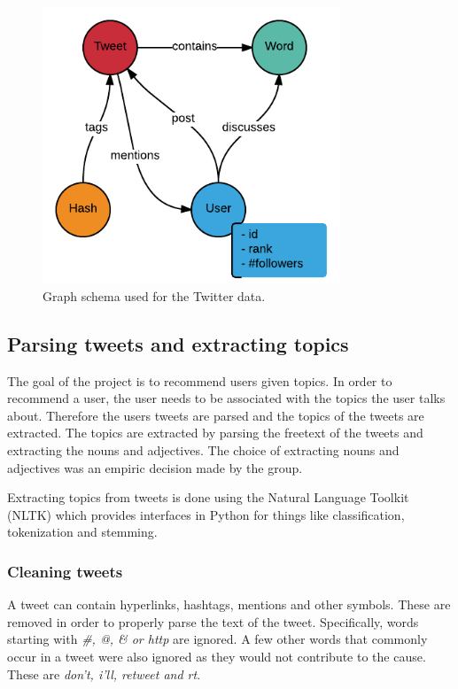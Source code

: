 \begin{figure}[t]
\centering
\includegraphics[width=3.5in,natwidth=440,natheight=409]{images/Schema.png}
\caption{Graph schema used for the Twitter data.}
\label{fig:schema}
\end{figure}


\subsection{Parsing tweets and extracting topics}

The goal of the project is to recommend users given topics. In order to
recommend a user, the user needs to be associated with the topics the user talks
about. Therefore the users tweets are parsed and the topics of the tweets are
extracted.  The topics are extracted by parsing the freetext of the tweets and
extracting the nouns and adjectives.  The choice of extracting nouns and
adjectives was an empiric decision made by the group.

Extracting topics from tweets is done using the Natural Language Toolkit (NLTK)
\cite{bird2006nltk} which provides interfaces in Python for things like
classification, tokenization and stemming.

\subsubsection{Cleaning tweets}

A tweet can contain hyperlinks, hashtags, mentions and other symbols. These are
removed in order to properly parse the text of the tweet. Specifically, words
starting with \textit{\#, @, \& or http} are ignored. A few other words that
commonly occur in a tweet were also ignored as they would not contribute to the
cause. These are \textit{don't, i'll, retweet and rt}.

